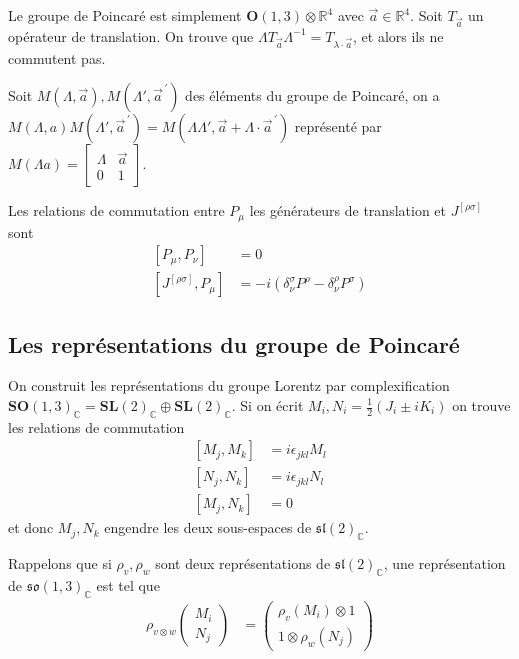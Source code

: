 \documentclass[10pt]{report}
\newcommand{\pvec}[1]{\vec{#1}^{\,\prime}}
\begin{document}
Le groupe de Poincar\'e est simplement $\mathbf{O}(1,3) \otimes \mathbb{R}^4$ avec $\vec{a} \in \mathbb{R}^4$. Soit $T_{\vec{a}}$ un op\'erateur de translation. On trouve que $\Lambda T_{\vec{a}}\Lambda^{-1} = T_{\lambda \cdot \vec{a}}$, et alors ils ne commutent pas.

Soit $M(\Lambda, \vec{a}), M(\Lambda', \pvec{a})$ des \'el\'ements du groupe de Poincar\'e, on a $M(\Lambda, a)M(\Lambda', \pvec{a}) = M(\Lambda \Lambda', \vec{a} + \Lambda \cdot \pvec{a})$ repr\'esent\'e par $M(\Lambda a) = \begin{bmatrix} \Lambda & \vec{a}\\0 & 1 \end{bmatrix} $. 

Les relations de commutation entre $P_\mu$ les g\'en\'erateurs de translation et $J^{[\rho \sigma]}$ sont
\begin{align}
    \left[ P_\mu, P_\nu \right] &= 0\\
    \left[ J^{[\rho \sigma]}, P_\mu \right] &= -i \left( \delta^{\sigma}_\nu P^{\rho} - \delta^{\rho}_\nu P^{\sigma} \right)
\end{align}

\subsection{Les repr\'esentations du groupe de Poincar\'e}

On construit les repr\'esentations du groupe Lorentz par complexification $\mathbf{SO}(1,3)_{\mathbb{C}} = \mathbf{SL}(2)_{\mathbb{C}} \oplus \mathbf{SL}(2)_\mathbb{C}$. Si on \'ecrit $M_i, N_i = \frac{1}{2}\left( J_i \pm iK_i \right)$ on trouve les relations de commutation
\begin{align}
    \left[ M_j, M_k \right] &= i\epsilon_{jkl}M_l\\
    \left[ N_j, N_k \right] &= i\epsilon_{jkl}N_l\\
    \left[ M_j, N_k \right] &= 0
\end{align}
et donc $M_j, N_k$ engendre les deux sous-espaces de $\mathfrak{sl}(2)_{\mathbb{C}}$. 

Rappelons que si $\rho_v, \rho_w$ sont deux repr\'esentations de $\mathfrak{sl}(2)_{\mathbb{C}}$, une repr\'esentation de $\mathfrak{so}(1,3)_{\mathbb{C}}$ est tel que
\begin{align}
    \rho_{v \otimes w}\begin{pmatrix} M_i\\N_j \end{pmatrix} &= \begin{pmatrix} \rho_v(M_i) \otimes 1\\ 1 \otimes \rho_w (N_j) \end{pmatrix} 
\end{align}
\end{document}
